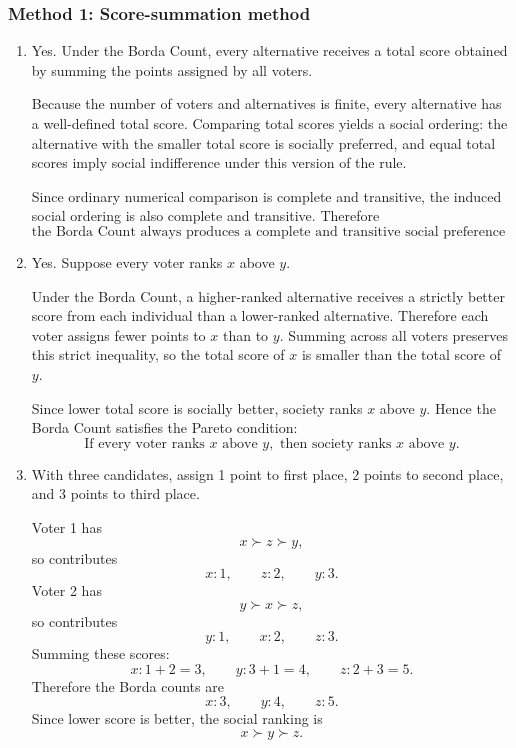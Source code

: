 \documentclass[12pt]{article}
\begin{document}
\subsubsection{Method 1: Score-summation method}

\begin{enumerate}[label=(\alph*)]
    \item
    Yes. Under the Borda Count, every alternative receives a total score obtained by summing the points assigned by all voters.

    Because the number of voters and alternatives is finite, every alternative has a well-defined total score. Comparing total scores yields a social ordering: the alternative with the smaller total score is socially preferred, and equal total scores imply social indifference under this version of the rule.

    Since ordinary numerical comparison is complete and transitive, the induced social ordering is also complete and transitive. Therefore
    \[
    \boxed{\text{the Borda Count always produces a complete and transitive social preference ordering.}}
    \]

    \item
    Yes. Suppose every voter ranks $x$ above $y$.

    Under the Borda Count, a higher-ranked alternative receives a strictly better score from each individual than a lower-ranked alternative. Therefore each voter assigns fewer points to $x$ than to $y$. Summing across all voters preserves this strict inequality, so the total score of $x$ is smaller than the total score of $y$.

    Since lower total score is socially better, society ranks $x$ above $y$. Hence the Borda Count satisfies the Pareto condition:
    \[
    \boxed{\text{If every voter ranks }x\text{ above }y,\text{ then society ranks }x\text{ above }y.}
    \]

    \item
    With three candidates, assign 1 point to first place, 2 points to second place, and 3 points to third place.

    Voter 1 has
    \[
    x \succ z \succ y,
    \]
    so contributes
    \[
    x:1,\qquad z:2,\qquad y:3.
    \]
    Voter 2 has
    \[
    y \succ x \succ z,
    \]
    so contributes
    \[
    y:1,\qquad x:2,\qquad z:3.
    \]
    Summing these scores:
    \[
    x:1+2=3,
    \qquad
    y:3+1=4,
    \qquad
    z:2+3=5.
    \]
    Therefore the Borda counts are
    \[
    \boxed{x:3,\qquad y:4,\qquad z:5.}
    \]
    Since lower score is better, the social ranking is
    \[
    \boxed{x \succ y \succ z.}
    \]


\end{enumerate}
\end{document}
